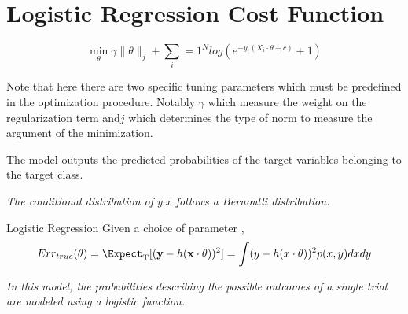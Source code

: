 \section{Logistic Regression Cost Function}

\begin{equation} \label{logit}
 \min_{\theta} \gamma\| \theta\|_{j}  + \sum_i=1^N log(e^{-y_i (X_i \cdot \theta + c )} +1) 
\end{equation}

Note that here there are two specific tuning parameters which must be predefined in the optimization procedure. Notably $\gamma$ which measure the weight on the regularization term and$j$ which determines the type of norm to measure the argument of the minimization.

The model outputs the predicted probabilities of the target variables belonging to the target class.

\textit{The conditional distribution of $y|x$ follows a Bernoulli distribution.}


\begin{definition}{Logistic Regression}
Given a choice of parameter \theta,
\[
    Err_{true}(\theta)  = \Expect_{ \mathrm{T}}[(\textbf{y} - h(\textbf{x} \cdot \theta) )^2] \\
    = \int (y - h(x \cdot \theta) )^2 p(x,y)dxdy
\]
\end{definition}

\textit{In this model, the probabilities describing the possible outcomes of a single trial are modeled using a logistic function.}

\textit{}

\textit{}
\textit{}
\textit{}